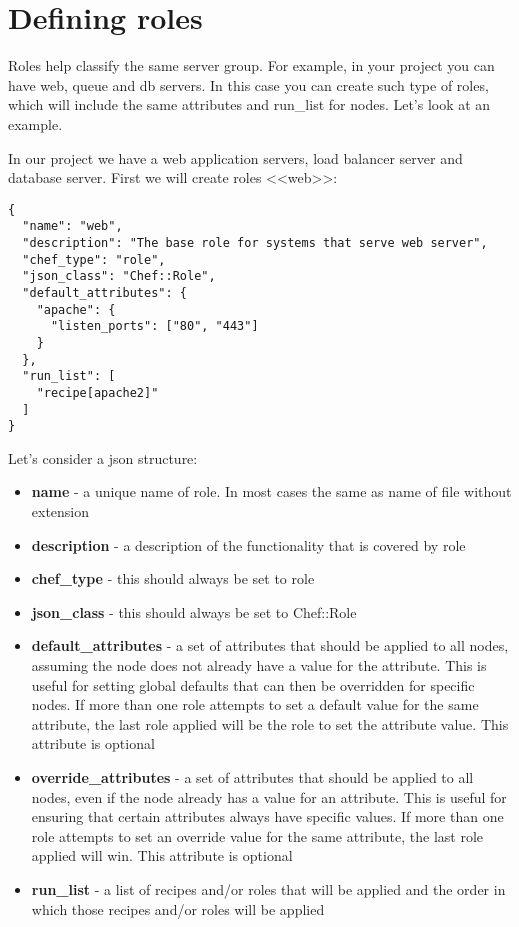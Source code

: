 \section{Defining roles}

Roles help classify the same server group. For example, in your project you can have web, queue and db servers. In this case you can create such type of roles, which will include the same attributes and run\_list for nodes. Let's look at an example.

In our project we have a web application servers, load balancer server and database server. First we will create roles <<web>>:

\begin{lstlisting}[label=lst:my-cloud-role1,title=my-cloud/roles/web.json]
{
  "name": "web",
  "description": "The base role for systems that serve web server",
  "chef_type": "role",
  "json_class": "Chef::Role",
  "default_attributes": {
    "apache": {
      "listen_ports": ["80", "443"]
    }
  },
  "run_list": [
    "recipe[apache2]"
  ]
}
\end{lstlisting}

Let's consider a json structure:

\begin{itemize}
  \item \textbf{name} - a unique name of role. In most cases the same as name of file without extension
  \item \textbf{description} - a description of the functionality that is covered by role
  \item \textbf{chef\_type} - this should always be set to role
  \item \textbf{json\_class} - this should always be set to Chef::Role
  \item \textbf{default\_attributes} - a set of attributes that should be applied to all nodes, assuming the node does not already have a value for the attribute. This is useful for setting global defaults that can then be overridden for specific nodes. If more than one role attempts to set a default value for the same attribute, the last role applied will be the role to set the attribute value. This attribute is optional
  \item \textbf{override\_attributes} - a set of attributes that should be applied to all nodes, even if the node already has a value for an attribute. This is useful for ensuring that certain attributes always have specific values. If more than one role attempts to set an override value for the same attribute, the last role applied will win. This attribute is optional
  \item \textbf{run\_list} - a list of recipes and/or roles that will be applied and the order in which those recipes and/or roles will be applied
\end{itemize}

